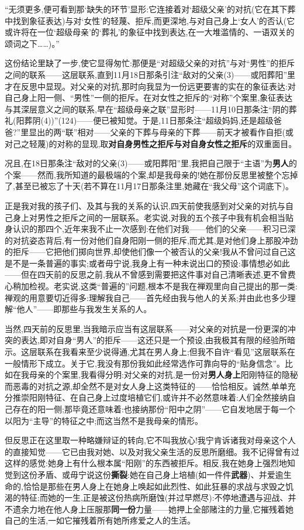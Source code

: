 “无须更多,便可看到那‘缺失的环节’显形:它连接着对‘超级父亲’的对抗(它在其下葬中找到象征表达)与对‘女性’的轻蔑、拒斥,而更深地,与对自己身上‘女人’的否认(它或许将在一位‘超级母亲’的‘葬礼’的象征中找到表达,在一大堆滥情的、一语双关的颂词之下……)。”

这份结论里缺了一步,使它显得匆忙:那便是“对超级父亲的对抗”与对“男性”的拒斥之间的联系——这层联系,直到11月18日那条引注“敌对的父亲(3)——或阳葬阳”里才在反思中显现。对父亲的对抗,那时向我显为一份远更要害的实在的象征表达:对自己身上阳一侧、“男性”一侧的拒斥。在对女性之拒斥的“对称”个案里,象征表达与其深层意义之间的联系,早在“超级母亲之联”显形时——11月10日那条注“阴的葬礼(阳葬阴(4))”(124)——便已被知觉。于是,11日那条注“超级妈妈,还是超级爸爸?”里显出的两“联”相对——父亲的下葬与母亲的下葬——前天才被看作自拒(或对己之轻蔑)的对称的显现,取\textbf{对自身男性之拒斥与对自身女性之拒斥}的双重面目。

况且,在18日那条注“敌对的父亲(3)——或阳葬阳”里,我把自己限于“主语”为\textbf{男人}的个案——然而,我所知道的最极端的个案,却是我母亲的!她在那份反思里被整个忘掉了,甚至已被忘了十天(若不算在11月17日那条注里,她藏在“我父母”这个词底下)。

正是我对我的孩子们、及其与我的关系的认识,四天前使我感到对父亲的对抗与自己身上对男性之拒斥之间的一层联系\dmark{}。老实说,对我的五个孩子中我有机会相当贴身认识的那四个,近年来我不止一次感到:在他们对我——他们的父亲——积习已深的对抗姿态背后,有一份对他们自身阳刚一侧的拒斥,而尤其,是对他们身上那股冲劲的拒斥——它把他们掷向世界,却使他们像一个被否认的父亲!我从不曾问过自己这是不是一条普遍的事实;或者毋宁说,我身上有一种未说出口的预设:事情想必如此——但在四天前的反思之前,我从不曾感到需要把这件事对自己清晰表述,更不曾费心稍加检视。老实说,这类“普遍的”问题,根本不是我在禅观里向自己提出的那一类:禅观的用意要切近得多:理解我自己——首先经由我与他人的关系;并由此也多少理解“他人”——即那些与我发生关系的人。

当然,四天前的反思里,当我暗示应当有这层联系——对父亲的对抗是一份更深的冲突的表达,即对自身“男人”的拒斥——这还只是一个预设,由我极其有限的经验所暗示。这层联系在我看来至少说得通,尤其在男人身上;但我不自许“看见”这层联系在一般情形下成立。关于它,我没有那份我如此经常选作可靠向导的“贴身信念”。比如在我母亲的个案里,我看得分明:对父亲的对抗,是一份对\textbf{男人身上}阳刚特征的隐秘而恶毒的对抗之源,却全然不是对女人身上这类特征的——恰恰相反。诚然,单单充分推崇阳刚特征、在自己身上过度培植它们,或许并不必然意味着:人们全然接纳自己存在的阳一侧;那毕竟还意味着:也接纳那份“阳中之阴”——它自发地居于每一个以阳为“主导”的特征之中;而这当然不是我母亲的情形。

但反思正在这里取一种略嫌辩证的转向,它不叫我放心!我宁肯诉诸我对母亲这个人的直接知觉——它已由我对她、以及对我父亲生活的反思所磨细。我不记得曾有过这样的感觉:她身上有什么根本属“阳刚”的东西被拒斥。相反,我在她身上强烈地知觉到这份矛盾、或毋宁说这份\textbf{撕裂}:她在自己身上培植(如一件件\textbf{武器})、并爱逾生命的,恰恰是那些在男人身上在她身上唤起如此烈性、如此狂暴的求战与求毁之饥渴的特征;而她的一生,正是被这份热病所磨蚀(并过早燃尽):不停地遭遇与迎战、并不遗余力地在他人身上压服那\textbf{同一份}力量——她押上全部赌注的力量,它摧残着她自己的生活,一如它摧残着所有她所疼爱之人的生活。

